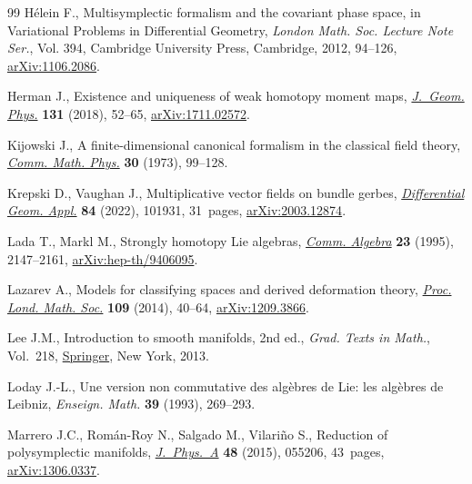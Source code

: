\documentclass[10pt,a4paper]{amsart}
\numberwithin{equation}{section}
\begin{document}
\begin{thebibliography}{99}
H\'elein F., Multisymplectic formalism and the covariant phase space, in
  Variational Problems in Differential Geometry, \textit{London Math. Soc.
  Lecture Note Ser.}, Vol. 394, Cambridge University Press, Cambridge, 2012,
  94--126, \href{https://arxiv.org/abs/1106.2086}{arXiv:1106.2086}.

Herman J., Existence and uniqueness of weak homotopy moment maps,
  \href{https://doi.org/10.1016/j.geomphys.2018.05.001}{\textit{J.~Geom. Phys.}} \textbf{131} (2018), 52--65, \href{https://arxiv.org/abs/1711.02572}{arXiv:1711.02572}.

Kijowski J., A finite-dimensional canonical formalism in the classical field
  theory, \href{https://doi.org/10.1007/BF01645975}{\textit{Comm. Math. Phys.}} \textbf{30} (1973), 99--128.

Krepski D., Vaughan J., Multiplicative vector fields on bundle gerbes,
  \href{https://doi.org/10.1016/j.difgeo.2022.101931}{\textit{Differential Geom. Appl.}} \textbf{84} (2022), 101931, 31~pages,
  \href{https://arxiv.org/abs/2003.12874}{arXiv:2003.12874}.

Lada T., Markl M., Strongly homotopy {L}ie algebras, \href{https://doi.org/10.1080/00927879508825335}{\textit{Comm. Algebra}}
  \textbf{23} (1995), 2147--2161, \href{https://arxiv.org/abs/hep-th/9406095}{arXiv:hep-th/9406095}.

Lazarev A., Models for classifying spaces and derived deformation theory,
  \href{https://doi.org/10.1112/plms/pdt069}{\textit{Proc. Lond. Math. Soc.}} \textbf{109} (2014), 40--64,
  \href{https://arxiv.org/abs/1209.3866}{arXiv:1209.3866}.

Lee J.M., Introduction to smooth manifolds, 2nd ed., \textit{Grad. Texts in Math.}, Vol.~218, \href{https://doi.org/10.1007/978-1-4419-9982-5}{Springer}, New York, 2013.

Loday J.-L., Une version non commutative des alg\`ebres de {L}ie: les alg\`ebres
  de {L}eibniz, \textit{Enseign. Math.} \textbf{39} (1993), 269--293.

Marrero J.C., Rom\'an-Roy N., Salgado M., Vilari\~no S., Reduction of
  polysymplectic manifolds, \href{https://doi.org/10.1088/1751-8113/48/5/055206}{\textit{J.~Phys.~A}} \textbf{48} (2015), 055206,
  43~pages, \href{https://arxiv.org/abs/1306.0337}{arXiv:1306.0337}.


\end{thebibliography}
\end{document}
